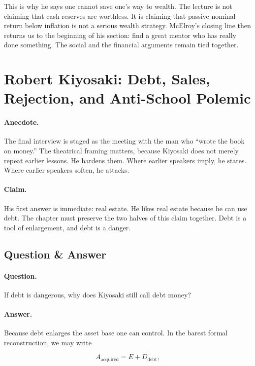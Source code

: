 This is why he says one cannot save one's way to wealth. The lecture is not claiming that cash reserves are worthless. It is claiming that passive nominal return below inflation is not a serious wealth strategy. McElroy's closing line then returns us to the beginning of his section: find a great mentor who has really done something. The social and the financial arguments remain tied together.

\section{Robert Kiyosaki: Debt, Sales, Rejection, and Anti-School Polemic}

\paragraph{Anecdote.} The final interview is staged as the meeting with the man who ``wrote the book on money.'' The theatrical framing matters, because Kiyosaki does not merely repeat earlier lessons. He hardens them. Where earlier speakers imply, he states. Where earlier speakers soften, he attacks.

\paragraph{Claim.} His first answer is immediate: real estate. He likes real estate because he can use debt. The chapter must preserve the two halves of this claim together. Debt is a tool of enlargement, and debt is a danger.

\subsection{Question \& Answer}

\paragraph{Question.} If debt is dangerous, why does Kiyosaki still call debt money?

\paragraph{Answer.} Because debt enlarges the asset base one can control. In the barest formal reconstruction, we may write

\begin{equation}
A_{\text{acquired}} = E + D_{\text{debt}},
\end{equation}

